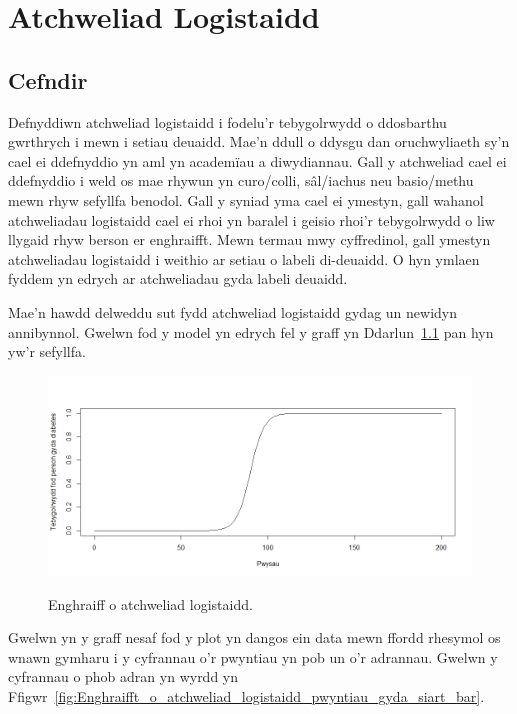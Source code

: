 \chapter{Atchweliad Logistaidd}\label{cha:Atchweliad_logistaidd}
\section{Cefndir}
Defnyddiwn atchweliad logistaidd i fodelu'r tebygolrwydd o ddosbarthu gwrthrych i mewn i setiau deuaidd. Mae'n ddull o ddysgu dan oruchwyliaeth sy'n cael ei ddefnyddio yn aml yn academ\"{i}au a diwydiannau. Gall y atchweliad cael ei ddefnyddio i weld os mae rhywun yn curo/colli, s\^{a}l/iachus neu basio/methu mewn rhyw sefyllfa benodol. Gall y syniad yma cael ei ymestyn, gall wahanol atchweliadau logistaidd cael ei rhoi yn baralel i geisio rhoi'r tebygolrwydd o liw llygaid rhyw berson er enghraifft. Mewn termau mwy cyffredinol, gall ymestyn atchweliadau logistaidd i weithio ar setiau o labeli di-deuaidd. O hyn ymlaen fyddem yn edrych ar atchweliadau gyda labeli deuaidd\cite{logistic-regression}. 

Mae'n hawdd delweddu sut fydd atchweliad logistaidd gydag un newidyn annibynnol. Gwelwn fod y model yn edrych fel y graff yn Ddarlun~\ref{fig:Enghraifft_o_atchweliad_logistaidd} pan hyn yw'r sefyllfa.

\begin{figure}[H]
\begin{center}
\includegraphics[width=0.5\linewidth]{../img/Atchweliad_logistaidd.jpeg}
\label{fig:Enghraifft_o_atchweliad_logistaidd}
\caption{Enghraiff o atchweliad logistaidd.}
\end{center}
\end{figure}

Gwelwn yn y graff nesaf fod y plot yn dangos ein data mewn ffordd rhesymol os wnawn gymharu i y cyfrannau o'r pwyntiau yn pob un o'r adrannau. Gwelwn y cyfrannau o phob adran yn wyrdd yn Ffigwr~\ref{fig:Enghraifft_o_atchweliad_logistaidd_pwyntiau_gyda_siart_bar}. 

